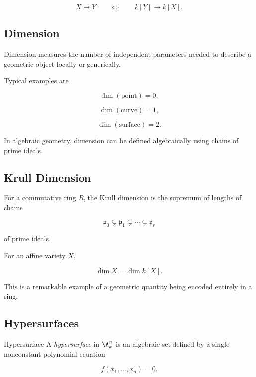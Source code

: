 \[
\boxed{
X\longrightarrow Y
\qquad\Longleftrightarrow\qquad
k[Y]\longrightarrow k[X].
}
\]

\subsection{Dimension}
\label{subsec:algebraic-dimension}

Dimension measures the number of independent parameters needed to describe a
geometric object locally or generically.

Typical examples are

\[
\boxed{
\dim(\text{point})=0,
}
\]

\[
\boxed{
\dim(\text{curve})=1,
}
\]

\[
\boxed{
\dim(\text{surface})=2.
}
\]

In algebraic geometry, dimension can be defined algebraically using chains of
prime ideals.

\subsection{Krull Dimension}
\label{subsec:krull-dimension-geometry}

For a commutative ring \(R\), the Krull dimension is the supremum of lengths
of chains

\[
\boxed{
\mathfrak p_0
\subsetneq
\mathfrak p_1
\subsetneq
\cdots
\subsetneq
\mathfrak p_r
}
\]

of prime ideals.

For an affine variety \(X\),

\[
\boxed{
\dim X=\dim k[X].
}
\]

This is a remarkable example of a geometric quantity being encoded entirely
in a ring.

\subsection{Hypersurfaces}
\label{subsec:algebraic-hypersurfaces}

\begin{definitionbox}{Hypersurface}
A \emph{hypersurface} in \(\A^n_k\) is an algebraic set defined by a single
nonconstant polynomial equation

\[
\boxed{
f(x_1,\ldots,x_n)=0.
}
\]
\end{definitionbox}

